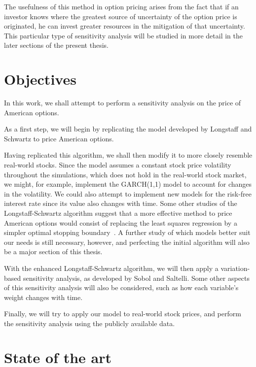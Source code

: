 \documentclass[a4paper,twocolumn,aps,prd,longbibliography,superscriptaddress]{revtex4-1}
\begin{document}
The usefulness of this method in option pricing arises from the fact that if an investor knows where the greatest source of uncertainty of the option price is originated, he can invest greater resources in the mitigation of that uncertainty.
This particular type of sensitivity analysis will be studied in more detail in the later sections of the present thesis.



\section{Objectives}
In this work, we shall attempt to perform a sensitivity analysis on the price of American options.

As a first step, we will begin by replicating the model developed by Longstaff and Schwartz to price American options.

Having replicated this algorithm, we shall then modify it to more closely resemble real-world stocks.
Since the model assumes a constant stock price volatility throughout the simulations, which does not hold in the real-world stock market, we might, for example, implement the GARCH(1,1) model to account for changes in the volatility.
We could also attempt to implement new models for the risk-free interest rate since its value also changes with time.
Some other studies of the Longstaff-Schwartz algorithm suggest that a more effective method to price American options would consist of replacing the least squares regression by a simpler optimal stopping boundary~\cite{Andersen}.
A further study of which models better suit our needs is still necessary, however, and perfecting the initial algorithm will also be a major section of this thesis.

With the enhanced Longstaff-Schwartz algorithm, we will then apply a variation-based sensitivity analysis, as developed by Sobol and Saltelli.
Some other aspects of this sensitivity analysis will also be considered, such as how each variable's weight changes with time.


Finally, we will try to apply our model to real-world stock prices, and perform the sensitivity analysis using the publicly available data.



\section{State of the art}
\end{document}
